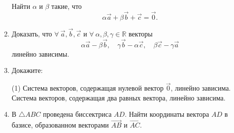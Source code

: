 \begin{enumerate}
	 Найти $\alpha$ и $\beta$ такие, что
	 $$\alpha \vec a + \beta \vec b + \vec c = \vec 0.$$
	 
	 \item Доказать, что $\forall\ {\vec a, \vec b, \vec c}$ и $\forall\ {\alpha, \beta, \gamma} \in \mathbb{R}$ векторы
	 $$\alpha \vec a - \beta \vec b,\quad \gamma \vec b -\alpha \vec c, \quad \beta \vec c - \gamma \vec a$$
	 линейно зависимы.
	 
	\item Докажите:
	\begin{tasks}(1)
		\task Система векторов, содержащая нулевой вектор $\vec 0$, линейно зависима.
		\task Система векторов, содержащая два равных вектора, линейно зависима.  
	\end{tasks}
	
	\item В $\triangle ABC$ проведена биссектриса $AD$. Найти координаты вектора $AD$ в базисе, образованном векторами $\overrightarrow{AB}$ и $\overrightarrow{AC}$.

\end{enumerate}